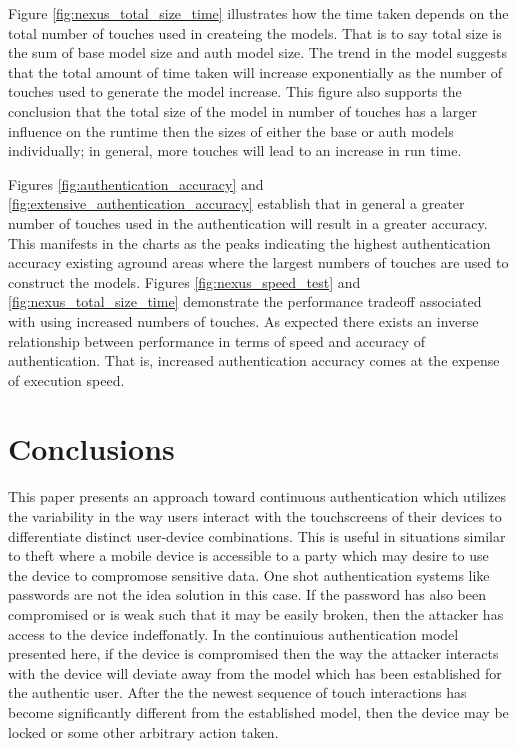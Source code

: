 \documentclass{acm_proc_article-sp}
\begin{document}
Figure \ref{fig:nexus_total_size_time} illustrates how the time taken depends on the total number of touches used in createing the models. That is to say total size is the sum of base model size and auth model size. The trend in the model suggests that the total amount of time taken will increase exponentially as the number of touches used to generate the model increase.
This figure also supports the conclusion that the total size of the model in number of touches has a larger influence on the runtime then the sizes of either the base or auth models individually; in general, more touches will lead to an increase in run time.


Figures \ref{fig:authentication_accuracy} and \ref{fig:extensive_authentication_accuracy} establish that in general a greater number of touches used in the authentication will result in a greater accuracy. This manifests in the charts as the peaks indicating the highest authentication accuracy existing aground areas where the largest numbers of touches are used to construct the models. Figures \ref{fig:nexus_speed_test} and \ref{fig:nexus_total_size_time} demonstrate the performance tradeoff associated with using increased numbers of touches. 
As expected there exists an inverse relationship between performance in terms of speed and accuracy of authentication. That is, increased authentication accuracy comes at the expense of execution speed.

\section{Conclusions}
\label{sec:conclusions}
This paper presents an approach toward continuous authentication which utilizes the variability in the way users interact with the touchscreens of their devices to differentiate distinct user-device combinations. 
This is useful in situations similar to theft where a mobile device is accessible to a party which may desire to use the device to compromose sensitive data. One shot authentication systems like passwords are not the idea solution in this case. If the password has also been compromised or is weak such that it may be easily broken, then the attacker has access to the device indeffonatly. In the continuious authentication model presented here, if the device is compromised then the way the attacker interacts with the device will deviate away from the model which has been established for the authentic user. After the the newest sequence of touch interactions has become significantly different from the established model, then the device may be locked or some other arbitrary action taken. 
\end{document}
